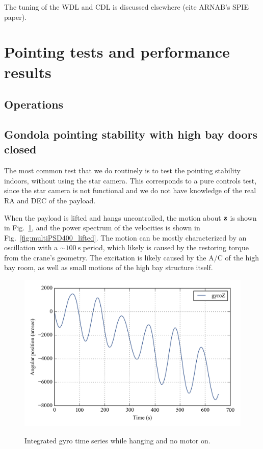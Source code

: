 The tuning of the WDL and CDL is discussed elsewhere (cite ARNAB's SPIE paper).



\section{Pointing tests and performance results}

\subsection{Operations}


\subsection{Gondola pointing stability with high bay doors closed}

The most common test that we do routinely is to test the pointing stability indoors, without using the star camera. This corresponds to a pure controls test, since the star camera is not functional and we do not have knowledge of the real RA and DEC of the payload. 

When the payload is lifted and hangs uncontrolled, the motion about $\textrm{\textbf{z}}$ is shown in Fig.~\ref{fig:intgralgyroZ400}, and the power spectrum of the velocities is shown in Fig.~\ref{fig:multiPSD400_lifted}. The motion can be mostly characterized by an oscillation with a $\sim\SI{100}{\second}$ period, which likely is caused by the restoring torque from the crane's geometry. The excitation is likely caused by the A/C of the high bay room, as well as small motions of the high bay structure itself.

\begin{figure}[!ht]
\begin{center}
\includegraphics{Figures/integral_lifted_gyroZ.png}
\label{fig:intgralgyroZ400}
\vspace{-0.5cm}
\caption[Integrated gyro time series while hanging]{Integrated gyro time series while hanging and no motor on.}
\end{center}
\end{figure}

